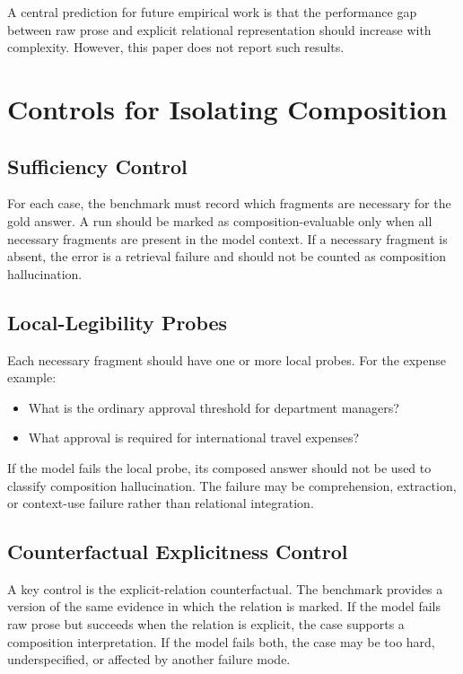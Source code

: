 \documentclass[11pt]{article}
\begin{document}
A central prediction for future empirical work is that the performance gap between raw prose and explicit relational representation should increase with complexity. However, this paper does not report such results.

\section{Controls for Isolating Composition}

\subsection{Sufficiency Control}

For each case, the benchmark must record which fragments are necessary for the gold answer. A run should be marked as composition-evaluable only when all necessary fragments are present in the model context. If a necessary fragment is absent, the error is a retrieval failure and should not be counted as composition hallucination.

\subsection{Local-Legibility Probes}

Each necessary fragment should have one or more local probes. For the expense example:

\begin{itemize}[leftmargin=*,itemsep=2pt]
    \item What is the ordinary approval threshold for department managers?
    \item What approval is required for international travel expenses?
\end{itemize}

If the model fails the local probe, its composed answer should not be used to classify composition hallucination. The failure may be comprehension, extraction, or context-use failure rather than relational integration.

\subsection{Counterfactual Explicitness Control}

A key control is the explicit-relation counterfactual. The benchmark provides a version of the same evidence in which the relation is marked. If the model fails raw prose but succeeds when the relation is explicit, the case supports a composition interpretation. If the model fails both, the case may be too hard, underspecified, or affected by another failure mode.
\end{document}
